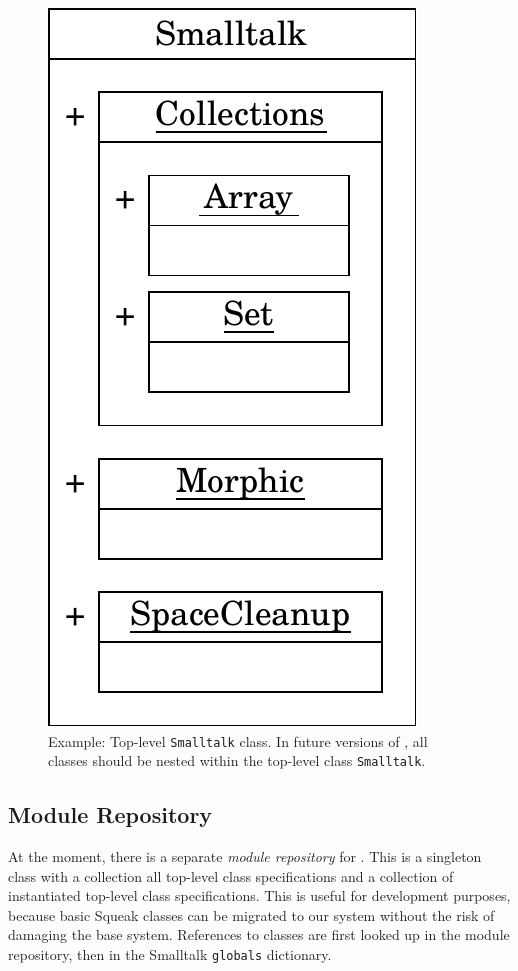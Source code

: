 \begin{figure}
	\includegraphics[scale=0.75]{st_nested.pdf}
	\centering
	\caption[Example: Top-level \texttt{Smalltalk} class]{Example: Top-level \texttt{Smalltalk} class. In future versions of \msname, all classes should be nested within the top-level class \texttt{Smalltalk}.}
	\label{fig:impl_st_nested_future}
\end{figure}
\subsection{Module Repository}
At the moment, there is a separate \emph{module repository} for \msname. This is a singleton class with a collection all top-level class specifications and a collection of instantiated top-level class specifications. This is useful for development purposes, because basic Squeak classes can be migrated to our system without the risk of damaging the base system. References to classes are first looked up in the module repository, then in the Smalltalk \texttt{globals} dictionary.

